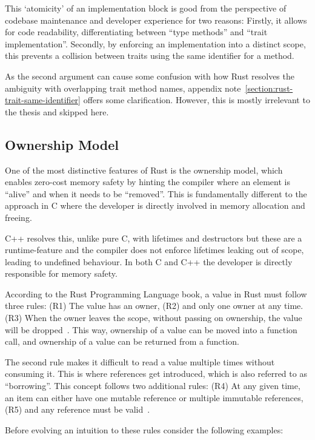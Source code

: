 \documentclass[11pt,
               a4paper,
               bibtotoc,
               idxtotoc,
               headsepline,
               footsepline,
               footexclude,
               BCOR12mm,
               DIV13,
               openany,   %
               ]
               {scrbook}
\begin{document}
This `atomicity' of an implementation block is good from the perspective of codebase maintenance and developer experience for two reasons: Firstly, it allows for code readability, differentiating between ``type methods'' and ``trait implementation''. Secondly, by enforcing an implementation into a distinct scope, this prevents a collision between traits using the same identifier for a method.

As the second argument can cause some confusion with how Rust resolves the ambiguity with overlapping trait method names, appendix note~\ref{section:rust-trait-same-identifier} offers some clarification. However, this is mostly irrelevant to the thesis and skipped here.

\subsection{Ownership Model}

One of the most distinctive features of Rust is the ownership model, which enables zero-cost memory safety by hinting the compiler where an element is ``alive'' and when it needs to be ``removed''. This is fundamentally different to the approach in C where the developer is directly involved in memory allocation and freeing.

C++ resolves this, unlike pure C, with lifetimes and destructors but these are a runtime-feature\cite{cpp-lifetimes} and the compiler does not enforce lifetimes leaking out of scope, leading to undefined behaviour. In both C and C++ the developer is directly responsible for memory safety.

According to the Rust Programming Language book, a value in Rust must follow three rules: (R1) The value has an owner, (R2) and only one owner at any time. (R3) When the owner leaves the scope, without passing on ownership, the value will be dropped~\cite{rust-book-ownership-rules}. This way, ownership of a value can be moved into a function call, and ownership of a value can be returned from a function.

The second rule makes it difficult to read a value multiple times without consuming it. This is where references get introduced, which is also referred to as ``borrowing''. This concept follows two additional rules: (R4) At any given time, an item can either have one mutable reference or multiple immutable references, (R5) and any reference must be valid~\cite{rust-book-borrowing}.

Before evolving an intuition to these rules consider the following examples:
\end{document}

